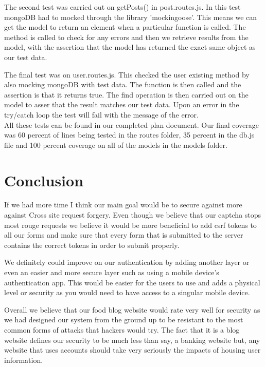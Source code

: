 \documentclass{ueacmpstyle}
\begin{document}
	The second test was carried out on getPosts() in post.routes.js.
	In this test mongoDB had to mocked through the library 'mockingoose'. This means we can get the model to return an element when a particular function is called. The method is called to check for any errors and then we retrieve results from the model, with the assertion that the model has returned the exact same object as our test data.
	
	The final test was on user.routes.js. This checked the user existing method by also mocking mongoDB with test data. The function is then called and the assertion is that it returns true.
	The find operation is then carried out on the model to asser that the result matches our test data. Upon an error in the try/catch loop the test will fail with the message of the error.\\
	
	All these tests can be found in our completed plan document. Our final coverage was 60 percent of lines being tested in the routes folder, 35 percent in the db.js file and 100 percent coverage on all of the models in the models folder.
	
	
	
	\section{Conclusion}\label{sec:Con}
	
	If we had more time I think our main goal would be to secure against more against Cross site request forgery. Even though we believe that our captcha stops most rouge requests we believe it would be more beneficial to add csrf tokens to all our forms and make sure that every form that is submitted to the server contains the correct tokens in order to submit properly. 
	
	We definitely could improve on our authentication by adding another layer or even an easier and more secure layer such as using a mobile device's authentication app. This would be easier for the users to use and adds a physical level or security as you would need to have access to a singular mobile device.
	
	Overall we believe that our food blog website would rate very well for security as we had designed our system from the ground up to be resistant to the most common forms of attacks that hackers would try. The fact that it is a blog website defines our security to be much less than say, a banking website but, any website that uses accounts should take very seriously the impacts of housing user information.
	
\end{document}
